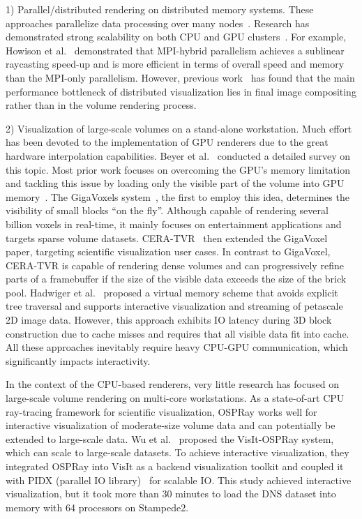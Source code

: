 1) Parallel/distributed rendering on distributed memory systems. These approaches
parallelize data processing over many nodes~\cite{childs2010extreme}. Research
has demonstrated strong scalability on both CPU and GPU clusters~\cite{childs2006scalable,
howison2012hybrid,peterka2008parallel,eilemann2009equalizer,fogal2010large,beyer2011distributed}. 
For example, Howison et al.~\cite{howison2012hybrid} demonstrated that MPI-hybrid
parallelism achieves a sublinear raycasting speed-up and is more efficient in terms of
overall speed and memory than the MPI-only parallelism.
However, previous work~\cite{wu2018visit} has found that the main
performance bottleneck of distributed visualization lies in final image compositing
rather than in the volume rendering process.

2) Visualization of large-scale volumes on a stand-alone workstation.
Much effort has been devoted to the implementation of GPU renderers
due to the great hardware interpolation capabilities\cite{feng2015parallel}.
Beyer et al.~\cite{beyer2014survey} conducted a detailed survey on this topic. Most prior work focuses on overcoming the GPU's
memory limitation and tackling this issue by loading only the visible
part of the volume into GPU memory~\cite{li2003empty}. 
The GigaVoxels system~\cite{crassin2007interactive,crassin2009gigavoxels}, the first to employ this idea, determines the visibility of
small blocks ``on the fly''.  
Although capable of rendering several billion voxels in real-time,
it mainly focuses on entertainment applications and targets sparse volume datasets.
CERA-TVR~\cite{engel2011cera} then extended the GigaVoxel paper, 
targeting scientific visualization user cases.
In contrast to GigaVoxel, CERA-TVR is capable of rendering dense volumes
and can progressively refine parts of a framebuffer if the size of the visible
data exceeds the size of the brick pool.
Hadwiger et al.~\cite{hadwiger2012interactive} proposed a virtual memory scheme
that avoids explicit tree traversal and supports interactive visualization and 
streaming of petascale 2D image data. However, this approach exhibits
IO latency during 3D block construction due to cache misses and requires that all
visible data fit into cache. All these approaches inevitably require
heavy CPU-GPU communication, which significantly impacts interactivity. 


In the context of the CPU-based renderers, very little research has focused
on large-scale volume rendering on multi-core workstations.
As a state-of-art CPU ray-tracing framework for scientific visualization,
OSPRay works well for interactive visualization of moderate-size volume data
and can potentially be extended to large-scale data.
Wu et al.~\cite{wu2018visit} proposed the VisIt-OSPRay system, which can scale to
large-scale datasets. To achieve interactive visualization, they integrated OSPRay
into VisIt as a backend visualization toolkit and coupled it with PIDX (parallel IO 
library)~\cite{kumar2011pidx} for scalable IO. 
This study achieved interactive visualization, but it took more than 30 minutes to load the DNS 
dataset into memory with 64 processors on Stampede2.

